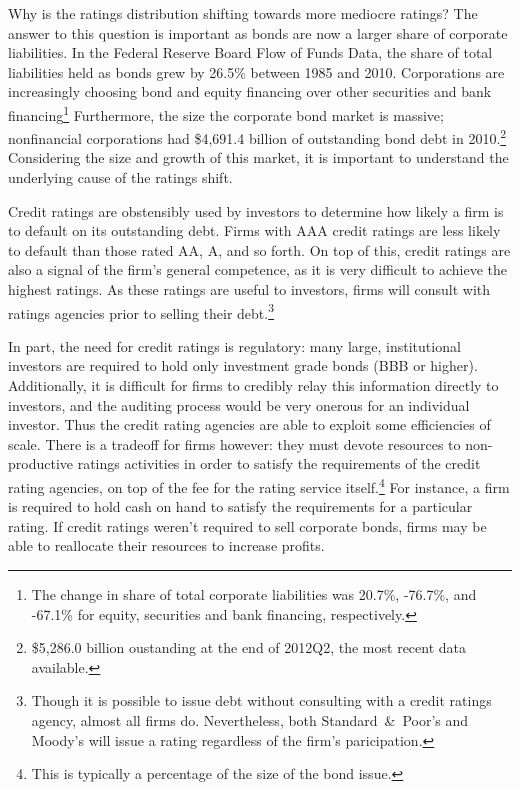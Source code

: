 \documentclass[titlepage]{article}
\begin{document}
Why is the ratings distribution shifting towards more mediocre ratings? The answer to this question is important as bonds are now a larger share of corporate liabilities. In the Federal Reserve Board Flow of Funds Data, the share of total liabilities held as bonds grew by 26.5\% between 1985 and 2010. Corporations are increasingly choosing bond and equity financing over other securities and bank financing\footnote{The change in share of total corporate liabilities was 20.7\%, -76.7\%, and -67.1\% for equity, securities and bank financing, respectively.} Furthermore, the size the corporate bond market is massive; nonfinancial corporations had \$4,691.4 billion of outstanding bond debt in 2010.\footnote{\$5,286.0 billion oustanding at the end of 2012Q2, the most recent data available.} Considering the size and growth of this market, it is important to understand the underlying cause of the ratings shift.

Credit ratings are obstensibly used by investors to determine how likely a firm is to default on its outstanding debt. Firms with AAA credit ratings are less likely to default than those rated AA, A, and so forth. On top of this, credit ratings are also a signal of the firm's general competence, as it is very difficult to achieve the highest ratings. As these ratings are useful to investors, firms will consult with ratings agencies prior to selling their debt.\footnote{Though it is possible to issue debt without consulting with a credit ratings agency, almost all firms do. Nevertheless, both Standard~\&~Poor's and Moody's will issue a rating regardless of the firm's paricipation.}

In part, the need for credit ratings is regulatory: many large, institutional investors are required to hold only investment grade bonds (BBB or higher). Additionally, it is difficult for firms to credibly relay this information directly to investors, and the auditing process would be very onerous for an individual investor. Thus the credit rating agencies are able to exploit some efficiencies of scale. There is a tradeoff for firms however: they must devote resources to non-productive ratings activities in order to satisfy the requirements of the credit rating agencies, on top of the fee for the rating service itself.\footnote{This is typically a percentage of the size of the bond issue.} For instance, a firm is required to hold cash on hand to satisfy the requirements for a particular rating. If credit ratings weren't required to sell corporate bonds, firms may be able to reallocate their resources to increase profits.
\end{document}
